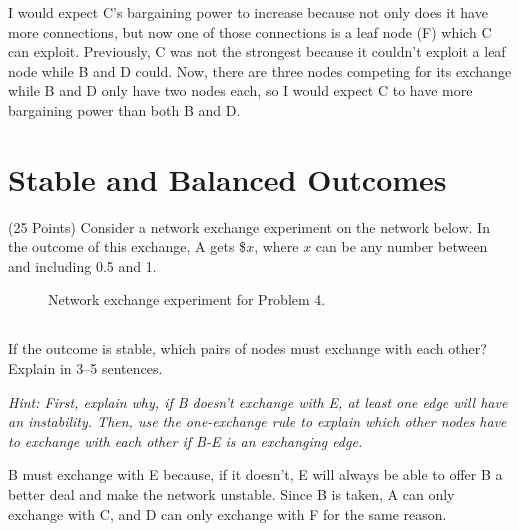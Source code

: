 \documentclass[newpages]{assignment}
\begin{document}
\begin{solution}
    I would expect C's bargaining power to increase because not only does it have more connections, but now one of those connections is a leaf node (F) which C can exploit. Previously, C was not the strongest because it couldn't exploit a leaf node while B and D could. Now, there are three nodes competing for its exchange while B and D only have two nodes each, so I would expect C to have more bargaining power than both B and D.
\end{solution}

\section{Stable and Balanced Outcomes}

\begin{problem}
    (25 Points) Consider a network exchange experiment on the network below. In the outcome of this exchange, A gets \$\(x\), where \(x\) can be any number between and including 0.5 and 1.

    \begin{figure}[H]
        \centering
        \caption{Network exchange experiment for Problem 4.}
        \label{fig:hw7-stable-balanced}
    \end{figure}
\end{problem}

\subsection{}
\begin{problem}
    If the outcome is stable, which pairs of nodes must exchange with each other? Explain in 3--5 sentences.

    \textit{Hint: First, explain why, if B doesn't exchange with E, at least one edge will have an instability. Then, use the one-exchange rule to explain which other nodes have to exchange with each other if B-E is an exchanging edge.}
\end{problem}
\begin{solution}
    B must exchange with E because, if it doesn't, E will always be able to offer B a better deal and make the network unstable. Since B is taken, A can only exchange with C, and D can only exchange with F for the same reason.
\end{solution}
\end{document}
